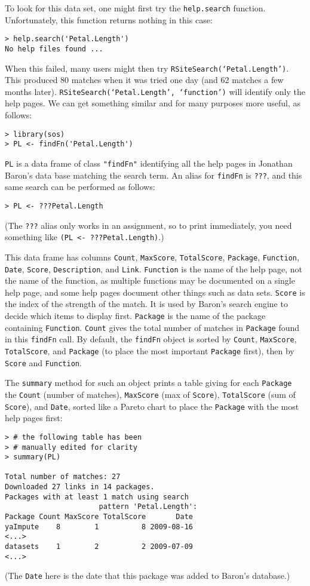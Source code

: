 To look for this data set, one might first try
the {\tt help.search} function.  Unfortunately, this function
returns nothing in this case:
\begin{verbatim}
> help.search('Petal.Length')
No help files found ...
\end{verbatim}
When this failed, many users might then try
{\tt RSiteSearch(`Petal.Length')}.  This produced 80 matches
when it was tried one day (and 62 matches a few months later).
{\tt RSiteSearch(`Petal.Length', `function')} will identify
only the help pages.  We can get something similar and for
many purposes more useful, as follows:
\begin{verbatim}
> library(sos)
> PL <- findFn('Petal.Length')
\end{verbatim}
{\tt PL} is a data frame of class {\tt "findFn"} identifying
all the help pages in Jonathan Baron's data base matching the
search term.  An alias for {\tt findFn} is {\tt ???}, and this same
search can be performed as follows:
\begin{verbatim}
> PL <- ???Petal.Length
\end{verbatim}
(The {\tt ???} alias only works in an assignment, so to print
immediately, you need something like {\tt (PL <- ???Petal.Length)}.)

This data frame has columns {\tt Count},
{\tt MaxScore}, {\tt TotalScore}, {\tt Package}, {\tt Function},
{\tt Date}, {\tt Score}, {\tt Description}, and {\tt Link}.
{\tt Function} is the name of the help page, not the name of the
function, as multiple functions may be documented on a single
help page, and some help pages document other things such as data
sets.  {\tt Score} is the index of the strength of the match.  It is used
by Baron's search engine to decide which items to display first.
{\tt Package} is the name of the package containing {\tt Function}.
{\tt Count} gives the total number of matches in {\tt Package} found in this
{\tt findFn} call.  By default, the {\tt findFn} object is sorted by
{\tt Count}, {\tt MaxScore}, {\tt TotalScore},
and {\tt Package} (to place the most important {\tt Package}
first), then by {\tt Score} and {\tt Function}.

The {\tt summary} method for such an object prints a table giving
for each {\tt Package} the {\tt Count} (number of matches),
{\tt MaxScore} (max of {\tt Score}), {\tt TotalScore} (sum of
{\tt Score}), and {\tt Date}, sorted like a Pareto chart to place
the {\tt Package} with the most help pages first:
\begin{verbatim}
> # the following table has been
> # manually edited for clarity
> summary(PL)

Total number of matches: 27
Downloaded 27 links in 14 packages.
Packages with at least 1 match using search
                      pattern 'Petal.Length':
Package Count MaxScore TotalScore       Date
yaImpute    8        1          8 2009-08-16
<...>
datasets    1        2          2 2009-07-09
<...>
\end{verbatim}
(The {\tt Date} here is the date that this package was added
to Baron's database.)

